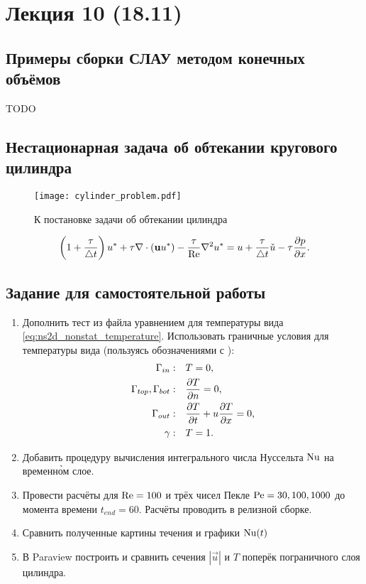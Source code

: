 \section{Лекция 10 (18.11)}
\subsection{Примеры сборки СЛАУ методом конечных объёмов}
TODO
\subsection{Нестационарная задача об обтекании кругового цилиндра}
\begin{figure}[h!]
\centering
\texttt{[image: cylinder\_problem.pdf]}
\caption{К постановке задачи об обтекании цилиндра}
\label{fig:cylinder-problem}

\end{figure}
\begin{equation}
\label{eq:ustar_fvm}
\left(1 + \frac{\tau}{\triangle t}\right) u^* + \tau \nabla\cdot(\boldsymbol{\rm u} u^*) - \frac{\tau}{\mathrm{Re}}\nabla^2 u^* = u + \frac{\tau}{\triangle t} \check u - \tau \frac{\partial p}{\partial x}.
\end{equation}


\subsection{Задание для самостоятельной работы}
\begin{enumerate}
\item
Дополнить тест  из файла 
уравнением для температуры вида \cref{eq:ns2d_nonstat_temperature}.
Использовать граничные условия для температуры вида (пользуясь обозначениями с ):
\begin{equation*}
\begin{aligned}
\Gamma_{in}:                &\quad T = 0,\\
\Gamma_{top}, \Gamma_{bot}: &\quad \frac{\partial T}{\partial n} = 0, \\
\Gamma_{out}:               &\quad \frac{\partial T}{\partial t} + u\frac{\partial T}{\partial x} = 0,\\
\gamma:                     &\quad T = 1. \\
\end{aligned}
\end{equation*}
\item
Добавить процедуру вычисления интегрального числа Нуссельта $\mathrm{Nu}$ на временн\`{о}м слое.
\item
Провести расчёты для $\mathrm{Re}=100$ и трёх чисел Пекле $\mathrm{Pe} = 30, 100, 1000$ до момента времени $t_{end} = 60$. Расчёты
проводить в релизной сборке.
\item
Сравнить полученные картины течения и графики $\mathrm{Nu}(t)$
\item
В Paraview построить и сравнить сечения $|\vec u|$ и $T$ поперёк пограничного слоя цилиндра.
\end{enumerate}

